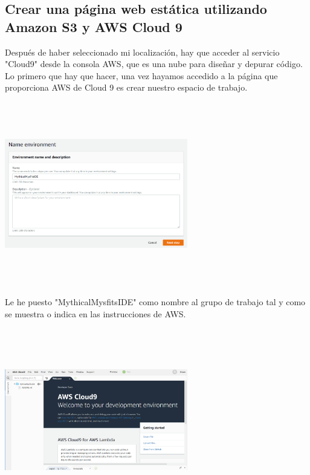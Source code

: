 \documentclass[english,runningheads,a4paper]{llncs}[2018/03/10]
\newenvironment{nscenter}
 {\parskip=0pt\par\nopagebreak\centering}
 {\par\noindent\ignorespacesafterend}
\begin{document}
\subsection*{Crear una página web estática utilizando Amazon S3 y AWS Cloud 9}
Después de haber seleccionado mi localización, hay que acceder al servicio 
"Cloud9" desde la consola AWS, que es una nube para diseñar y depurar código.\\
Lo primero que hay que hacer, una vez hayamos accedido a la página que 
proporciona AWS de Cloud 9 es crear nuestro espacio de trabajo.
\newline
\begin{nscenter}
\includegraphics[width=8cm,height=8cm,keepaspectratio]{./Contenedores/AWS/21.png}
\end{nscenter}
\newline
Le he puesto "MythicalMysfitsIDE" como nombre al grupo de trabajo tal y como se 
muestra o indica en las instrucciones de AWS.
\newline
\begin{nscenter}
\includegraphics[width=8cm,height=8cm,keepaspectratio]{./Contenedores/AWS/22.png}
\end{nscenter}
\end{document}

